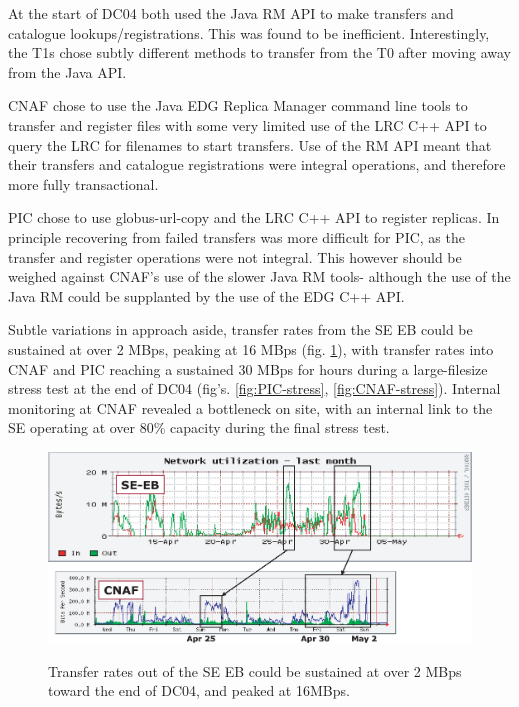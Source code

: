 \documentclass{cmspaper}
\begin{document}
At the start of DC04 both used the Java RM API to make transfers and catalogue lookups/registrations. This was found to be inefficient. Interestingly, the T1s chose subtly different methods to transfer from the T0 after moving away from the Java API.

CNAF chose to use the Java EDG Replica Manager command line tools to transfer and register files with some very limited use of the LRC C++ API to query the LRC for filenames to start transfers. Use of the RM API meant that their transfers and catalogue registrations were integral operations, and therefore more fully transactional. 

PIC chose to use globus-url-copy and the LRC C++ API to register replicas. In principle recovering from failed transfers was more difficult for PIC, as the transfer and register operations were not integral. This however should be weighed against CNAF's use of the slower Java RM tools- although the use of the Java RM could be supplanted by the use of the EDG C++ API.

Subtle variations in approach aside, transfer rates from the SE EB could be sustained at over 2 MBps, peaking at 16 MBps (fig. \ref{fig:SE-EB-network}), with transfer rates into CNAF and PIC reaching a sustained 30 MBps for hours during a large-filesize stress test at the end of DC04 (fig's. \ref{fig:PIC-stress}, \ref{fig:CNAF-stress}). Internal monitoring at CNAF revealed a bottleneck on site, with an internal link to the SE operating at over 80\% capacity during the final stress test.

\begin{figure}[tbp]
\centering
\includegraphics[width=15cm]{SE-EB-network.eps}
\label{fig:SE-EB-network}
\caption{Transfer rates out of the SE EB could be sustained at over 2 MBps toward the end of DC04, and peaked at 16MBps.}
\end{figure}
\end{document}
